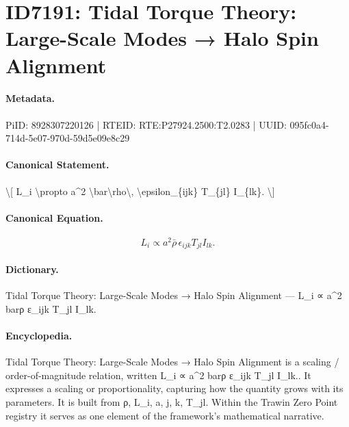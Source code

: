 \section*{ID7191: Tidal Torque Theory: Large-Scale Modes → Halo Spin Alignment}
\paragraph{Metadata.}
PiID: 8928307220126 | RTEID: RTE:P27924.2500:T2.0283 | UUID: 095fc0a4-714d-5e07-970d-59d5e09e8c29

\paragraph{Canonical Statement.}
\textbackslash{}[ L\_i \textbackslash{}propto a\textasciicircum{}2 \textbackslash{}bar\textbackslash{}rho\textbackslash{}, \textbackslash{}epsilon\_\{ijk\} T\_\{jl\} I\_\{lk\}. \textbackslash{}]

\paragraph{Canonical Equation.}
\[
L_i \propto a^2 \bar\rho\, \epsilon_{ijk} T_{jl} I_{lk}.
\]

\paragraph{Dictionary.}
Tidal Torque Theory: Large-Scale Modes → Halo Spin Alignment — L\_i ∝ a\textasciicircum{}2 barρ ε\_ijk T\_jl I\_lk.

\paragraph{Encyclopedia.}
Tidal Torque Theory: Large-Scale Modes → Halo Spin Alignment is a scaling / order-of-magnitude relation, written L\_i ∝ a\textasciicircum{}2 barρ ε\_ijk T\_jl I\_lk.. It expresses a scaling or proportionality, capturing how the quantity grows with its parameters. It is built from ρ, L\_i, a, j, k, T\_jl. Within the Trawin Zero Point registry it serves as one element of the framework's mathematical narrative.
